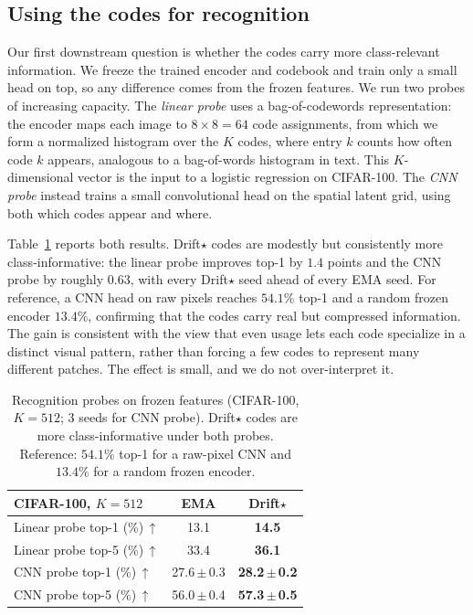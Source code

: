 \documentclass[10pt,twocolumn,letterpaper]{article}
\begin{document}
\subsection{Using the codes for recognition}
\label{sec:recognition}

Our first downstream question is whether the codes carry more class-relevant information. We freeze the trained encoder and codebook and train only a small head on top, so any difference comes from the frozen features. We run two probes of increasing capacity. The \emph{linear probe} uses a bag-of-codewords representation: the encoder maps each image to $8{\times}8{=}64$ code assignments, from which we form a normalized histogram over the $K$ codes, where entry $k$ counts how often code $k$ appears, analogous to a bag-of-words histogram in text. This $K$-dimensional vector is the input to a logistic regression on CIFAR-100. The \emph{CNN probe} instead trains a small convolutional head on the spatial latent grid, using both which codes appear and where.

Table~\ref{tab:recognition} reports both results. Drift$\star$ codes are modestly but
consistently more class-informative: the linear probe improves top-1 by $1.4$ points and
the CNN probe by roughly $0.63$, with every Drift$\star$ seed ahead of every EMA seed. For
reference, a CNN head on raw pixels reaches $54.1\%$ top-1 and a random frozen encoder
$13.4\%$, confirming that the codes carry real but compressed information. The gain is
consistent with the view that even usage lets each code specialize in a distinct visual
pattern, rather than forcing a few codes to represent many different patches. The effect
is small, and we do not over-interpret it.

\begin{table}[ht]
\centering\small
\begin{tabular}{lcc}
\toprule
CIFAR-100, $K{=}512$ & EMA & Drift$\star$\\
\midrule
Linear probe top-1 (\%)\,$\uparrow$ & 13.1 & \textbf{14.5}\\
Linear probe top-5 (\%)\,$\uparrow$ & 33.4 & \textbf{36.1}\\
CNN probe top-1 (\%)\,$\uparrow$ & 27.6\,$\pm$\,0.3 & \textbf{28.2\,$\pm$\,0.2}\\
CNN probe top-5 (\%)\,$\uparrow$ & 56.0\,$\pm$\,0.4 & \textbf{57.3\,$\pm$\,0.5}\\
\bottomrule
\end{tabular}
\vspace{2mm}
\caption{Recognition probes on frozen features (CIFAR-100, $K{=}512$; $3$ seeds for
CNN probe). Drift$\star$ codes are more class-informative under both probes. Reference:
$54.1\%$ top-1 for a raw-pixel CNN and $13.4\%$ for a random frozen encoder.}
\label{tab:recognition}
\end{table}
\end{document}
